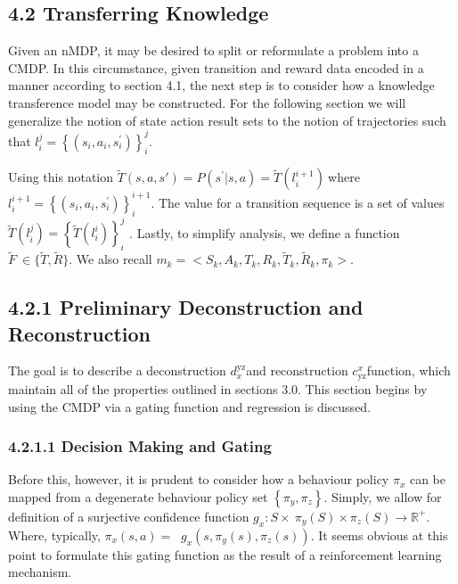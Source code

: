 \documentclass[compsoc,journal,letterpaper,10pt,draftclsnofoot,onecolumn]{IEEEtran}
\begin{document}
\subsection{4.2 Transferring Knowledge}\label{transferring-knowledge}

Given an nMDP, it may be desired to split or reformulate a problem into
a CMDP. In this circumstance, given transition and reward data encoded
in a manner according to section 4.1, the next step is to consider how a
knowledge transference model may be constructed. For the following
section we will generalize the notion of state action result sets to the
notion of trajectories such that
\(l_{i}^{j} = \left\{ (s_{i},a_{i},s_{i}^{'}) \right\}_{i}^{j}\).

Using this notation
\(\tilde{T}\left( s,a,s' \right) = P\left( s^{'}|s,a \right) = \tilde{T}\left( l_{i}^{i + 1} \right)\ \)where
\(l_{i}^{i + 1} = \left\{ (s_{i},a_{i},s_{i}^{'}) \right\}_{i}^{i + 1}\).
The value for a transition sequence is a set of values
\(\tilde{T}\left( l_{i}^{j} \right) = \left\{ \tilde{T}\left( l_{i}^{i} \right) \right\}_{i}^{j}\)
. Lastly, to simplify analysis, we define a function
\(\tilde{F}\  \in \{\tilde{T},\tilde{R}\}\). We also recall
\(m_{k} = < S_{k},A_{k},T_{k},R_{k},{\tilde{T}}_{k},{\tilde{R}}_{k},\pi_{k} >\).

\subsection{4.2.1 Preliminary Deconstruction and Reconstruction
}\label{preliminary-deconstruction-and-reconstruction}

The goal is to describe a deconstruction \(d_{x}^{\text{yz}}\)and
reconstruction \(c_{\text{yz}}^{x}\)function, which maintain all of the
properties outlined in sections 3.0. This section begins by using the
CMDP via a gating function and regression is discussed.

\subsubsection{4.2.1.1 Decision Making and
Gating}\label{decision-making-and-gating}

Before this, however, it is prudent to consider how a behaviour policy
\(\pi_{x}\) can be mapped from a degenerate behaviour policy set
\(\left\{ \pi_{y},\pi_{z} \right\}\). Simply, we allow for definition of
a surjective confidence function
\(g_{x}:S \times \ \pi_{y}(S) \times \pi_{z}(S) \rightarrow \mathbb{R}^{+}\).
Where, typically,
\(\pi_{x}\left( s,a \right) = \operatorname{}{g_{x}\left( s,\pi_{y}\left( s \right),\pi_{z}(s) \right)}\).
It seems obvious at this point to formulate this gating function as the
result of a reinforcement learning mechanism.
\end{document}
